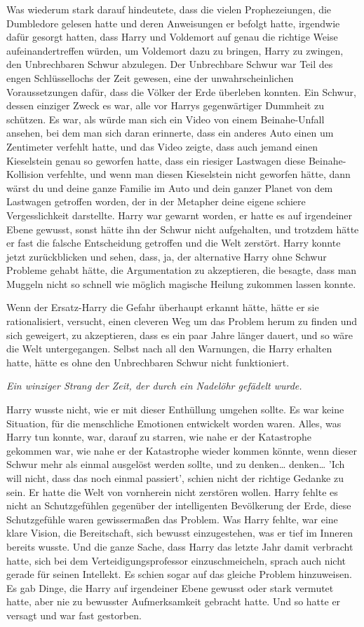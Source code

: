 {Was wiederum stark darauf hindeutete, dass die vielen Prophezeiungen, die Dumbledore gelesen hatte und deren Anweisungen er befolgt hatte, irgendwie dafür gesorgt hatten, dass Harry und Voldemort auf genau die richtige Weise aufeinandertreffen würden, um Voldemort dazu zu bringen, Harry zu zwingen, den Unbrechbaren Schwur abzulegen. Der Unbrechbare Schwur war Teil des engen Schlüssellochs der Zeit gewesen, eine der unwahrscheinlichen Voraussetzungen dafür, dass die Völker der Erde überleben konnten. Ein Schwur, dessen einziger Zweck es war, alle vor Harrys gegenwärtiger Dummheit zu schützen. Es war, als würde man sich ein Video von einem Beinahe-Unfall ansehen, bei dem man sich daran erinnerte, dass ein anderes Auto einen um Zentimeter verfehlt hatte, und das Video zeigte, dass auch jemand einen Kieselstein genau so geworfen hatte, dass ein riesiger Lastwagen diese Beinahe-Kollision verfehlte, und wenn man diesen Kieselstein nicht geworfen hätte, dann wärst du und deine ganze Familie im Auto und dein ganzer Planet von dem Lastwagen getroffen worden, der in der Metapher deine eigene schiere Vergesslichkeit darstellte. Harry war gewarnt worden, er hatte es auf irgendeiner Ebene gewusst, sonst hätte ihn der Schwur nicht aufgehalten, und trotzdem hätte er fast die falsche Entscheidung getroffen und die Welt zerstört. Harry konnte jetzt zurückblicken und sehen, dass, ja, der alternative Harry ohne Schwur Probleme gehabt hätte, die Argumentation zu akzeptieren, die besagte, dass man Muggeln nicht so schnell wie möglich magische Heilung zukommen lassen konnte.

Wenn der Ersatz-Harry die Gefahr überhaupt erkannt hätte, hätte er sie rationalisiert, versucht, einen cleveren Weg um das Problem herum zu finden und sich geweigert, zu akzeptieren, dass es ein paar Jahre länger dauert, und so wäre die Welt untergegangen. Selbst nach all den Warnungen, die Harry erhalten hatte, hätte es ohne den Unbrechbaren Schwur nicht funktioniert.

\emph{Ein winziger Strang der Zeit, der durch ein Nadelöhr gefädelt wurde.}

Harry wusste nicht, wie er mit dieser Enthüllung umgehen sollte. Es war keine Situation, für die menschliche Emotionen entwickelt worden waren. Alles, was Harry tun konnte, war, darauf zu starren, wie nahe er der Katastrophe gekommen war, wie nahe er der Katastrophe wieder kommen könnte, wenn dieser Schwur mehr als einmal ausgelöst werden sollte, und zu denken… denken… 'Ich will nicht, dass das noch einmal passiert', schien nicht der richtige Gedanke zu sein. Er hatte die Welt von vornherein nicht zerstören wollen. Harry fehlte es nicht an Schutzgefühlen gegenüber der intelligenten Bevölkerung der Erde, diese Schutzgefühle waren gewissermaßen das Problem. Was Harry fehlte, war eine klare Vision, die Bereitschaft, sich bewusst einzugestehen, was er tief im Inneren bereits wusste. Und die ganze Sache, dass Harry das letzte Jahr damit verbracht hatte, sich bei dem Verteidigungsprofessor einzuschmeicheln, sprach auch nicht gerade für seinen Intellekt. Es schien sogar auf das gleiche Problem hinzuweisen. Es gab Dinge, die Harry auf irgendeiner Ebene gewusst oder stark vermutet hatte, aber nie zu bewusster Aufmerksamkeit gebracht hatte. Und so hatte er versagt und war fast gestorben.

}
